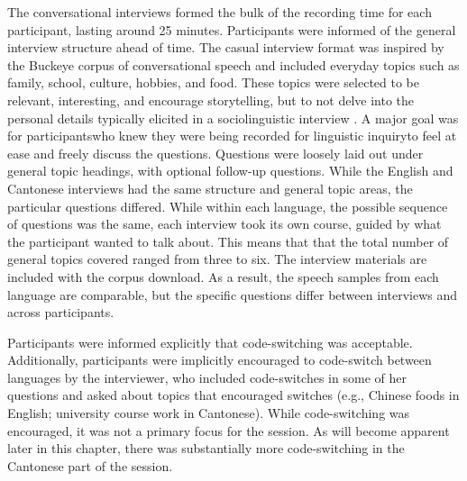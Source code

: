 The conversational interviews formed the bulk of the recording time for each participant, lasting around 25 minutes. Participants were informed of the general interview structure ahead of time. The casual interview format was inspired by the Buckeye corpus of conversational speech \citep{pitt_2005_buckeye} and included everyday topics such as family, school, culture, hobbies, and food. These topics were selected to be relevant, interesting, and encourage storytelling, but to not delve into the personal details typically elicited in a sociolinguistic interview \citep{nagy_2011_hlvc}. A major goal was for participants\textemdash who knew they were being recorded for linguistic inquiry\textemdash to feel at ease and freely discuss the questions. Questions were loosely laid out under general topic headings, with optional follow-up questions. While the English and Cantonese interviews had the same structure and general topic areas, the particular questions differed. While within each language, the possible sequence of questions was the same, each interview took its own course, guided by what the participant wanted to talk about. This means that that the total number of general topics covered ranged from three to six. The interview materials are included with the corpus download. As a result, the speech samples from each language are comparable, but the specific questions differ between interviews and across participants. 

Participants were informed explicitly that code-switching was acceptable. Additionally, participants were implicitly encouraged to code-switch between languages by the interviewer, who included code-switches in some of her questions and asked about topics that encouraged switches (e.g., Chinese foods in English; university course work in Cantonese). While code-switching was encouraged, it was not a primary focus for the session. As will become apparent later in this chapter, there was substantially more code-switching in the Cantonese part of the session.

